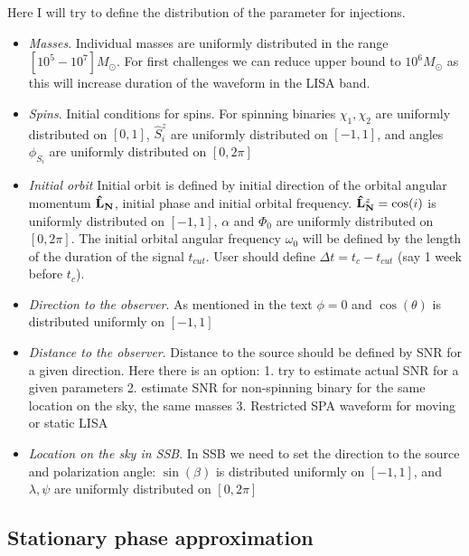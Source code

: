 \documentclass[11pt]{report}
\def\bL{{\bf \hat{L}_{N}}}
\begin{document}
Here I will try to define the distribution of the parameter for injections.
\begin{itemize}

\item {\it Masses}. Individual masses are uniformly distributed in the range
$[10^5 - 10^{7}]M_{\odot}$. For first challenges we can reduce upper bound to
$10^6M_{\odot}$ as this will increase duration of the waveform in the LISA band.

\item {\it Spins}. Initial conditions for spins. 
For spinning binaries $\chi_1,\chi_2$ are uniformly distributed
on $[0,1]$, $\hat{S}_i^z$ are uniformly distributed on $[-1,1]$, and angles
$\phi_{S_i}$ are uniformly distributed on $[0,2\pi]$

\item {\it Initial orbit} Initial orbit is defined by initial direction
of the orbital angular momentum $\bL$, initial phase and initial orbital frequency.
$\bL^z = \cos(i)$ is uniformly distributed on $[-1,1]$, $\alpha$ and $\Phi_0$ are uniformly
distributed on $[0,2\pi]$. The initial orbital angular frequency $\omega_0$ 
will be defined by the length of the duration of the signal $t_{cut}$. User should define 
$\Delta t = t_c - t_{cut}$ (say 1 week before $t_c$).

\item {\it Direction to the observer}. As mentioned in the text $\phi=0$ and
$\cos(\theta)$ is distributed uniformly on $[-1,1]$

\item {\it Distance to the observer}. Distance to the source should be defined
by SNR for a given direction. Here there is an option: 1. try to estimate actual
SNR for a given parameters 2. estimate SNR for non-spinning binary for the same
location on the sky, the same masses 3. Restricted SPA waveform for moving or
static LISA

\item {\it Location on the sky in SSB}. In SSB we need to set the direction to the source
and polarization angle: $\sin(\beta)$ is distributed uniformly on $[-1,1]$, and
$\lambda, \psi$ are uniformly distributed on $[0,2\pi]$

\end{itemize}

\subsection{Stationary phase approximation}
\end{document}
